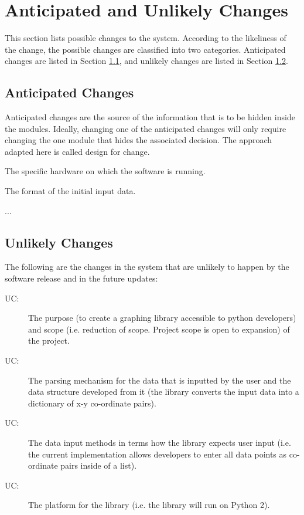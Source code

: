 \documentclass[12pt, titlepage]{article}
\newcounter{acnum}
\newcommand{\actheacnum}{AC\theacnum}
\newcounter{ucnum}
\newcommand{\uctheucnum}{UC\theucnum}
\begin{document}
\section{Anticipated and Unlikely Changes} \label{SecChange}

This section lists possible changes to the system. According to the likeliness
of the change, the possible changes are classified into two
categories. Anticipated changes are listed in Section \ref{SecAchange}, and
unlikely changes are listed in Section \ref{SecUchange}.

\subsection{Anticipated Changes} \label{SecAchange}

Anticipated changes are the source of the information that is to be hidden
inside the modules. Ideally, changing one of the anticipated changes will only
require changing the one module that hides the associated decision. The approach
adapted here is called design for
change.

\begin{description}
\item[ \actheacnum \label{acHardware}:] The specific
  hardware on which the software is running.
\item[ \actheacnum \label{acInput}:] The format of the
  initial input data.
\item ...
\end{description}

\subsection{Unlikely Changes} \label{SecUchange}

The following are the changes in the system that are unlikely to happen by the software release and in the future updates:

\begin{description}
\item[ \uctheucnum \label{ucIO}:] The purpose (to create a graphing library accessible to python developers) and scope (i.e. reduction of scope. Project scope is open to expansion) of the project.
\item[ \uctheucnum \label{ucInput}:] The parsing mechanism for the data that is inputted by the user and the data structure developed from it (the library converts the input data into a dictionary of x-y co-ordinate pairs).
\item[ \uctheucnum \label{ucInput}:]The data input methods in terms how the library expects user input (i.e. the current implementation allows developers to enter all data points as co-ordinate pairs inside of a list).
\item[ \uctheucnum \label{ucInput}:]The platform for the library (i.e. the library will run on Python 2).
\end{description}
\end{document}
